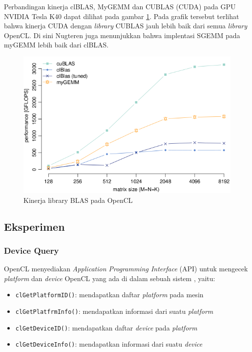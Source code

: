 Perbandingan kinerja clBLAS, MyGEMM dan CUBLAS (CUDA) \cite{opencl.clblas.tutorial} pada GPU NVIDIA Tesla K40 dapat dilihat pada gambar \ref{fig:opencl_blas_performance}. Pada grafik tersebut terlihat bahwa kinerja CUDA dengan \textit{library} CUBLAS jauh lebih baik dari semua \textit{library} OpenCL. Di sini Nugteren juga menunjukkan bahwa implentasi SGEMM pada myGEMM lebih baik dari clBLAS.

\begin{figure}
	\centering
	\includegraphics[width=1.0\textwidth]
	{pics/opencl_blas_performance.png}
	\caption{Kinerja library BLAS pada OpenCL}
	\label{fig:opencl_blas_performance}
\end{figure}


\subsection{Eksperimen}

\subsubsection{Device Query}

OpenCL menyediakan \textit{Application Programming Interface} (API) untuk mengecek \textit{platform} dan \textit{device} OpenCL yang ada di dalam sebuah sistem \cite{opencl.ebook} \cite{opencl.clgetplatforminfo}, yaitu:

\begin{itemize}
	\item \verb|clGetPlatformID()|: mendapatkan daftar \textit{platform} pada mesin
	\item \verb|clGetPlatfrmInfo()|: mendapatkan informasi dari suatu \textit{platform}
	\item \verb|clGetDeviceID()|: mendapatkan daftar \textit{device} pada \textit{platform}
	\item \verb|clGetDeviceInfo()|: mendapatkan informasi dari suatu \textit{device}
\end{itemize}

